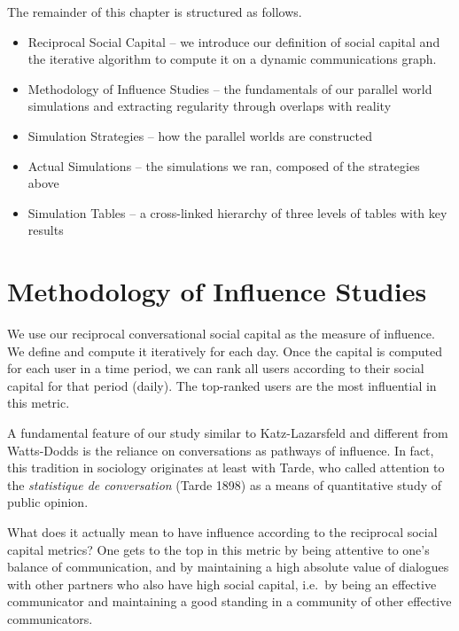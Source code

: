 \documentclass[10pt,oneside]{memoir}
\begin{document}
\begin{Spacing}{2}
The remainder of this chapter is structured as follows.


\begin{itemize}


\item Reciprocal Social Capital -- we introduce our definition of social capital and the iterative algorithm to compute it on a dynamic communications graph.

\item Methodology of Influence Studies -- the fundamentals of our parallel world simulations and extracting regularity through overlaps with reality

\item Simulation Strategies -- how the parallel worlds are constructed

\item Actual Simulations -- the simulations we ran, composed of the strategies above

\item Simulation Tables -- a cross-linked hierarchy of three levels of tables with key results
\end{itemize}

\pagebreak \section{Methodology of Influence Studies}
\label{methodologyofinfluencestudies}

We use our reciprocal conversational social capital as the measure of influence.  We define and compute it iteratively for each day.  Once the capital is computed for each user in a time period,  we can rank all users according to their social capital for that period (daily).  The top-ranked users are the most influential in this metric.


A fundamental feature of our study similar to Katz-Lazarsfeld and different from Watts-Dodds is the reliance on conversations as pathways of influence.  In fact, this tradition in sociology originates at least with Tarde, who called attention to  the \emph{statistique de conversation} (Tarde 1898) \cite{tarde1969communication} as a means of quantitative study of public opinion.


What does it actually mean to have influence according to the reciprocal social capital metrics?  One gets to the top in this metric by being attentive to one's balance of communication, and by maintaining a high absolute value of dialogues with other partners who also have high social capital, i.e.\ by being an effective communicator and maintaining a good standing in a community of other effective communicators.



\end{Spacing}
\end{document}
